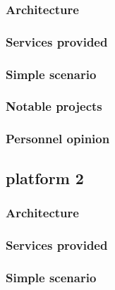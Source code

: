 \documentclass[a4paper,11pt]{report}
\begin{document}
  \subsubsection{Architecture}
  
  \subsubsection{Services provided}
  
  \subsubsection{Simple scenario}
  
  \subsubsection{Notable projects}
  
  \subsubsection{Personnel opinion}
  
  \subsection{platform 2} %
  
  \subsubsection{Architecture}
  
  \subsubsection{Services provided}
  
  \subsubsection{Simple scenario}
  
\end{document}
